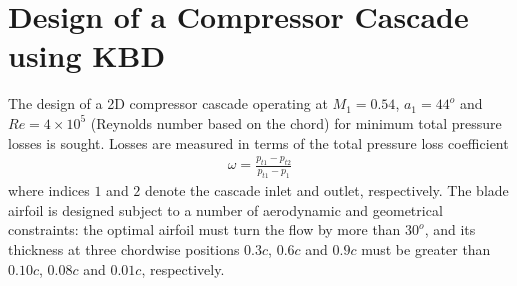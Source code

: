 



\section{Design of a Compressor Cascade using KBD}
\label{Drela1}
The design of a 2D compressor cascade operating at $M_1\!=\!0.54$, $a_1\!=\!44^o$ and $Re\!=\!4\times10^5$ (Reynolds number based on the chord) for minimum total pressure losses is sought. Losses are measured in terms of the total pressure loss coefficient 
\begin{eqnarray}
   \omega=\frac{p_{t1}-p_{t2}}{p_{t1}-p_1}
   \label{omegaLosses} 
\end{eqnarray}
where indices $1$ and $2$ denote the cascade inlet and outlet, respectively. 
The blade airfoil is designed subject to a number of aerodynamic and geometrical constraints: the optimal airfoil must turn the flow by more than $30^o$, and its thickness at three chordwise positions $0.3c$, $0.6c$ and $0.9c$ must be greater than $0.10c$, $0.08c$ and $0.01c$,  respectively.     

